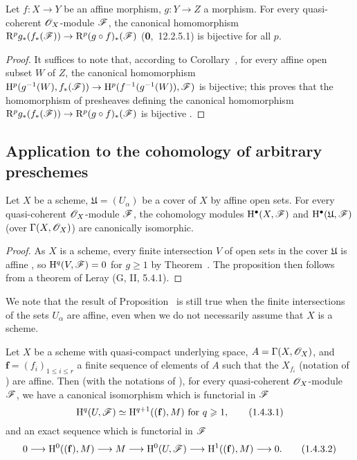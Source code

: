 \begin{corollary}[1.3.4]
\label{3.1.3.4}
Let $f:X\to Y$ be an affine morphism, $g:Y\to Z$ a morphism.
For every quasi-coherent $\mathscr{O}_X$-module $\mathscr{F}$, the canonical homomorphism $\RR^p g_*(f_*(\sh{F}))\to\RR^p(g\circ f)_*(\sh{F})$ (\textbf{0},~12.2.5.1) is bijective for all $p$.
\end{corollary}

\begin{proof}
\label{proof-3.1.3.4}
It suffices to note that, according to Corollary~, for every affine open subset $W$ of $Z$, the canonical homomorphism $\HH^p(g^{-1}(W),f_*(\sh{F}))\to\HH^p(f^{-1}(g^{-1}(W)),\sh{F})$ is bijective; this proves that the homomorphism of presheaves defining the canonical homomorphism $\RR^p g_*(f_*(\sh{F}))\to\RR^p(g\circ f)_*(\sh{F})$ is bijective .
\end{proof}

\subsection{Application to the cohomology of arbitrary preschemes}
\label{subsection:3.1.4}

\begin{proposition}[1.4.1]
\label{3.1.4.1}
Let $X$ be a scheme, $\mathfrak{U}=(U_\alpha)$ be a cover of $X$ by affine open sets.
For every quasi-coherent $\mathscr{O}_X$-module $\mathscr{F}$, the cohomology modules $\mathrm{H}^\bullet(X,\mathscr{F})$ and $\mathrm{H}^\bullet(\mathfrak{U},\mathscr{F})$ (over $\Gamma(X,\mathscr{O}_X)$) are canonically isomorphic.
\end{proposition}

\begin{proof}
\label{proof-3.1.4.1}
As $X$ is a scheme, every finite intersection $V$ of open sets in the cover $\mathfrak{U}$ is affine , so $\mathrm{H}^q(V,\mathscr{F})=0$ for $g\geq 1$ by Theorem~.
The proposition then follows from a theorem of Leray (G, II, 5.4.1).
\end{proof}

\begin{remark}[1.4.2]
\label{3.1.4.2}
We note that the result of Proposition~ is still true when the finite intersections of the sets $U_\alpha$ are affine, even when we do not necessarily assume that $X$ is a scheme.
\end{remark}

\begin{corollary}[1.4.3]
\label{3.1.4.3}
Let $X$ be a scheme with quasi-compact underlying space, $A=\Gamma(X,\mathscr{O}_X)$, and $\mathbf{f}=(f_i)_{1\leq i\leq r}$ a finite sequence of elements of $A$ such that the $X_{f_i}$ (notation of ) are affine.
Then (with the notations of ), for every quasi-coherent $\mathscr{O}_X$-module $\mathscr{F}$, we have a canonical isomorphism which is functorial in $\mathscr{F}$
\[
  \mathrm{H}^q(U,\mathscr{F})\simeq\mathrm{H}^{q+1}((\mathbf{f}),M)\text{ for }q\geqslant 1,
  \tag{1.4.3.1}
\]
and an exact sequence which is functorial in $\mathscr{F}$
\[
  0\to\HH^0((\mathbf{f}),M)\to M\to\HH^0(U,\sh{F})\to\HH^1((\mathbf{f}),M)\to 0.
  \tag{1.4.3.2}
\]
\end{corollary}


